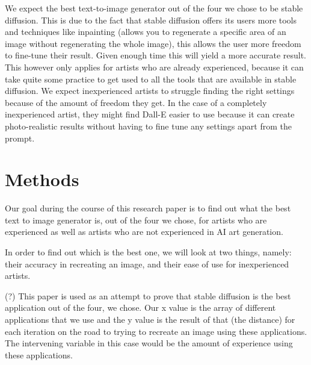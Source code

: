 \documentclass[]{report}
\begin{document}
We expect the best text-to-image generator out of the four we chose to be stable diffusion. This is due to the fact that stable diffusion offers its users more tools and techniques like inpainting (allows you to regenerate a specific area of an image without regenerating the whole image), this allows the user more freedom to fine-tune their result. Given enough time this will yield a more accurate result. This however only applies for artists who are already experienced, because it can take quite some practice to get used to all the tools that are available in stable diffusion. We expect inexperienced artists to struggle finding the right settings because of the amount of freedom they get. In the case of a completely inexperienced artist, they might find Dall-E easier to use because it can create photo-realistic results without having to fine tune any settings apart from the prompt.
	

	
	\section{Methods}
	
	Our goal during the course of this research paper is to find out what the best text to image generator is, out of the four we chose, for artists who are experienced as well as artists who are not experienced in AI art generation.
	
	In order to find out which is the best one, we will look at two things, namely: their accuracy in recreating an image, and their ease of use for inexperienced artists.
	
	(?) This paper is used as an attempt to prove that stable diffusion is the best application out of the four, we chose. Our x value is the array of different applications that we use and the y value is the result of that (the distance) for each iteration on the road to trying to recreate an image using these applications. The intervening variable in this case would be the amount of experience using these applications.
	
\end{document}
